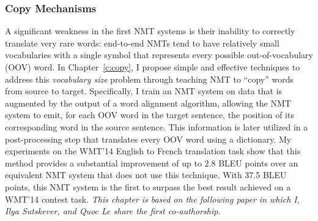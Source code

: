 \subsubsection*{Copy Mechanisms} 
A significant weakness in the first NMT 
systems is their inability to correctly translate very rare words:  
end-to-end NMTs tend to have relatively small vocabularies with a single
\unk{} symbol that represents every possible out-of-vocabulary (OOV) word. In
Chapter~\ref{c:copy}, I propose simple and effective techniques to address this
{\it vocabulary size} problem through teaching NMT to ``copy'' words from source to
target. Specifically, I train an NMT system on data that is augmented by the output of a word 
alignment algorithm, allowing the NMT system to emit, for each OOV word
in the target sentence, the position of its corresponding word in the source sentence.
This information is later utilized in a
post-processing step that translates every OOV word using a dictionary. My 
experiments on the WMT'14 English to French translation task show that this 
method provides a substantial improvement of up to 2.8 BLEU points over an
equivalent NMT system that does not use this technique. 
With 37.5 BLEU points, this NMT system is the first to surpass 
the best result achieved on a WMT'14 contest task. 
{\it This chapter is based
on the following paper \cite{luong15} in which I, Ilya Sutskever, and Quoc Le
share the first co-authorship.}

